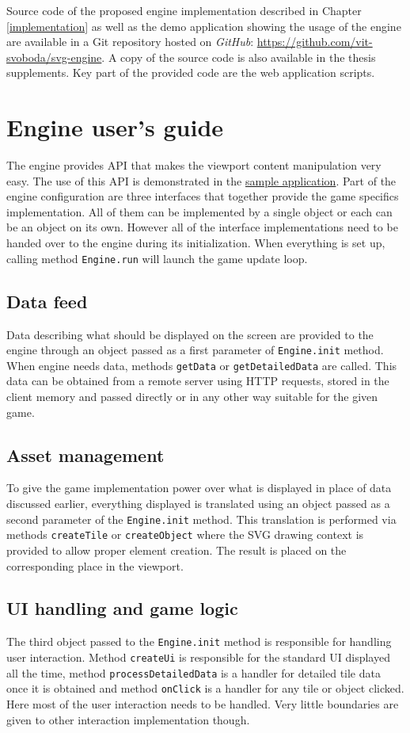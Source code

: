 \documentclass[11pt,oneside, final]{fithesis2}
\begin{document}
Source code of the proposed engine implementation described in Chapter \ref{implementation} as well as the demo application showing the usage of the engine are available in a Git repository hosted on \emph{GitHub}: \href{https://github.com/vit-svoboda/svg-engine}{https://github.com/vit-svoboda/svg-engine}. A copy of the source code is also available in the thesis supplements. Key part of the provided code are the web application scripts.

\chapter{Engine user's guide}
The engine provides API that makes the viewport content manipulation very easy. The use of this API is demonstrated in the \href{https://github.com/vit-svoboda/svg-engine/tree/master/src/main/webapp/Scripts/game}{sample application}. Part of the engine configuration are three interfaces that together provide the game specifics implementation. All of them can be implemented by a single object or each can be an object on its own. However all of the interface implementations need to be handed over to the engine during its initialization. When everything is set up, calling method \texttt{Engine.run} will launch the game update loop. 

\section{Data feed}
Data describing what should be displayed on the screen are provided to the engine through an object passed as a first parameter of \texttt{Engine.init} method. When engine needs data, methods \texttt{getData} or \texttt{getDetailedData} are called. This data can be obtained from a remote server using HTTP requests, stored in the client memory and passed directly or in any other way suitable for the given game.

\section{Asset management}
To give the game implementation power over what is displayed in place of data discussed earlier, everything displayed is translated using an object passed as a second parameter of the \texttt{Engine.init} method. This translation is performed via methods \texttt{createTile} or \texttt{createObject} where the SVG drawing context is provided to allow proper element creation. The result is placed on the corresponding place in the viewport.

\section{UI handling and game logic}
The third object passed to the \texttt{Engine.init} method is responsible for handling user interaction. Method \texttt{createUi} is responsible for the standard UI displayed all the time, method \texttt{processDetailedData} is a handler for detailed tile data once it is obtained and method \texttt{onClick} is a handler for any tile or object clicked. Here most of the user interaction needs to be handled. Very little boundaries are given to other interaction implementation though.
\end{document}
